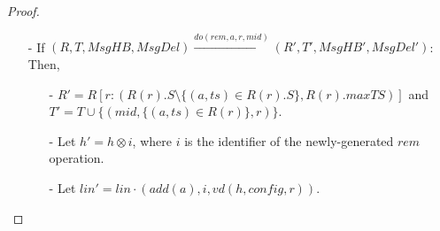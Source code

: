 {\begin {proof}
\begin{itemize}
    It is easy to see that $h'$ is still distributed linearizable and $\mathit{lin}'$ is its linearization. We need to prove that $R'(r) = \mathit{apply}(\mathit{lin}',\mathit{vd}(h',\mathit{del}',r))$ and $C_4$ still holds for message $\mathit{mid}$.

    We already know that $R(r) = \mathit{apply}(\mathit{lin},\mathit{vd}(h,\mathit{del},r))$. %



    By Lemma \ref{lemma:a property that can be obtained from P for or-set}, it is not hard to see that $C_4$ still holds for message $\mathit{mid}$. From construction of $R'(r)$, Lemma \ref{lemma:a property that can be obtained from P for or-set} and $C_4$ holds for message $\mathit{mid}$, we can see that $R'(r) = \mathit{apply}(\mathit{lin}',\mathit{vd}(h',\mathit{del}',r))$.%


\item[-] If $(R,T,\mathit{MsgHB},\mathit{MsgDel}) {\xrightarrow{\mathit{do}(\mathit{rem},a,r,\mathit{mid})}} (R',T',\mathit{MsgHB}',\mathit{MsgDel}')$: Then,

    \begin{itemize}
    \setlength{\itemsep}{0.5pt}
    \item[-] $R' = R[ r: (R(r).S \setminus \{ (a,\mathit{ts}) \in R(r).S \},R(r).\mathit{maxTS}) ]$ and $T' = T \cup \{ (\mathit{mid},\{ (a,\mathit{ts}) \in R(r) \},r) \}$.

    \item[-] Let $h' = h \otimes i$, where $i$ is the identifier of the newly-generated $\mathit{rem}$ operation.

    \item[-] Let $\mathit{lin}' = \mathit{lin} \cdot (\mathit{add}(a),i,\mathit{vd}(h,\mathit{config},r))$.


\end{itemize}
\end{itemize}
\end{proof}}

